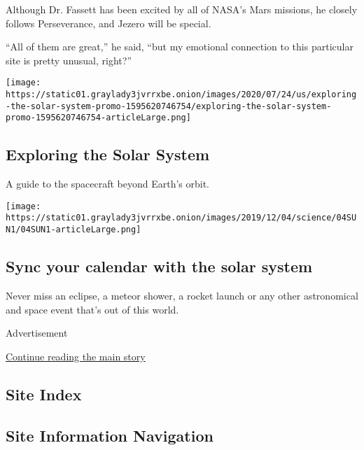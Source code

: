 Although Dr. Fassett has been excited by all of NASA's Mars missions, he
closely follows Perseverance, and Jezero will be special.

``All of them are great,'' he said, ``but my emotional connection to
this particular site is pretty unusual, right?''

\href{https://www.nytimes3xbfgragh.onion/interactive/2020/science/exploring-the-solar-system.html}{}

\texttt{[image: https://static01.graylady3jvrrxbe.onion/images/2020/07/24/us/exploring-the-solar-system-promo-1595620746754/exploring-the-solar-system-promo-1595620746754-articleLarge.png]}

\hypertarget{exploring-the-solar-system}{%
\subsection{Exploring the Solar
System}\label{exploring-the-solar-system}}

A guide to the spacecraft beyond Earth's orbit.

\href{https://www.nytimes3xbfgragh.onion/interactive/2020/science/2020-astronomy-space-calendar.html}{}

\texttt{[image: https://static01.graylady3jvrrxbe.onion/images/2019/12/04/science/04SUN1/04SUN1-articleLarge.png]}

\hypertarget{sync-your-calendar-with-the-solar-system}{%
\subsection{Sync your calendar with the solar
system}\label{sync-your-calendar-with-the-solar-system}}

Never miss an eclipse, a meteor shower, a rocket launch or any other
astronomical and space event that's out of this world.

Advertisement

\protect\hyperlink{after-bottom}{Continue reading the main story}

\hypertarget{site-index}{%
\subsection{Site Index}\label{site-index}}

\hypertarget{site-information-navigation}{%
\subsection{Site Information
Navigation}\label{site-information-navigation}}

